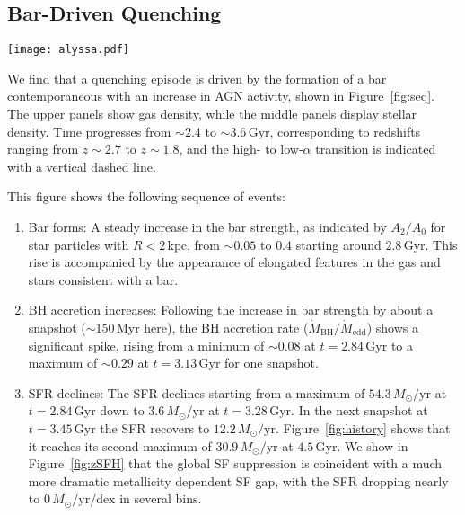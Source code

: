 \documentclass[twocolumn]{aastex631}
\newcommand{\Msun}{\ensuremath{M_{\odot}}}
\newcommand{\Gyr}{\ensuremath{\textrm{Gyr}}}
\newcommand{\Myr}{\ensuremath{\textrm{Myr}}}
\newcommand{\kpc}{\ensuremath{\textrm{kpc}}}
\newcommand{\Msunyr}{\ensuremath{\Msun/\textrm{yr}}}
\newcommand{\Msunyrdex}{\ensuremath{\Msun/\textrm{yr}/\textrm{dex}}}
\begin{document}
\subsection{Bar-Driven Quenching}\label{ssec:sequence_of_events}
\begin{figure*}
  \centering
  \texttt{[image: alyssa.pdf]}
  \caption{\textbf{Quiescence separating the high- and low-$\alpha$ sequences is preceded by AGN activity associated with bar formation.} Surface density projections of gas (top row) and star particles (middle row) in our galaxy across snapshots at different times during the high- to low-$\alpha$ transition. Below the projections is a plot showing the SFR, BH accretion rate (in units of $\dot{M}_{\textrm{BH}}/\dot{M}_{\textrm{edd}}$), and bar strength ($A_2/A_0$ for $R<2$ kpc). Time ranges from $\sim2.4\,\textrm{Gyr}$ to $\sim3.6\,\textrm{Gyr}$, corresponding to redshifts from $z\sim2.7$ to $z\sim1.8$. A sequence of events in which the bar strengthens, BH accretion increases, and SFR declines is seen, and is described more fully in the text.}
  \label{fig:seq}
\end{figure*}

We find that a quenching episode is driven by the formation of a bar contemporaneous with an increase in AGN activity, shown in Figure~\ref{fig:seq}. The upper panels show gas density, while the middle panels display stellar density. Time progresses from $\sim2.4$ to $\sim3.6\,\textrm{Gyr}$, corresponding to redshifts ranging from $z\sim2.7$ to $z\sim1.8$, and the high- to low-$\alpha$ transition is indicated with a vertical dashed line.

This figure shows the following sequence of events:
\begin{enumerate}
    \item Bar forms: A steady increase in the bar strength, as indicated by $A_2/A_0$ for star particles with $R<2\,\kpc$, from $\sim0.05$ to $0.4$ starting around $2.8\,\textrm{Gyr}$. This rise is accompanied by the appearance of elongated features in the gas and stars consistent with a bar.
    \item BH accretion increases: Following the increase in bar strength by about a snapshot ($\sim150\,\Myr$ here), the BH accretion rate ($\dot{M}_{\textrm{BH}}/\dot{M}_{\textrm{edd}}$) shows a significant spike, rising from a minimum of $\sim0.08$ at $t=2.84\,\Gyr$ to a maximum of $\sim0.29$ at $t=3.13\,\Gyr$ for one snapshot.
    \item SFR declines: The SFR declines starting from a maximum of $54.3\,\Msunyr$ at $t=2.84\,\Gyr$ down to $3.6\,\Msunyr$ at $t=3.28\,\Gyr$. In the next snapshot at $t=3.45\,\Gyr$ the SFR recovers to $12.2\,\Msunyr$. Figure~\ref{fig:history} shows that it reaches its second maximum of $30.9\,\Msunyr$ at $4.5\,\Gyr$. We show in Figure~\ref{fig:zSFH} that the global SF suppression is coincident with a much more dramatic metallicity dependent SF gap, with the SFR dropping nearly to $0\,\Msunyrdex$ in several bins.
\end{enumerate}
\end{document}
